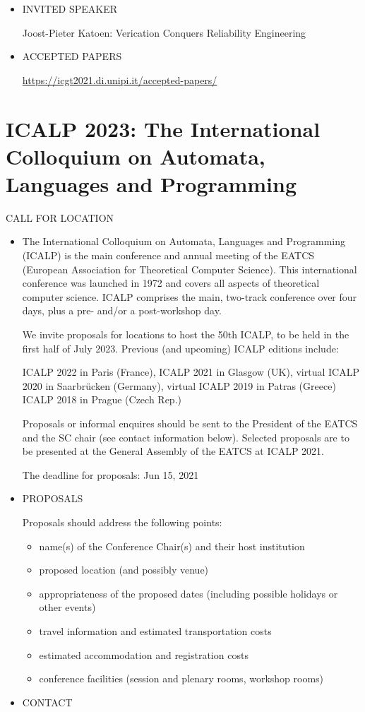 \documentclass[prodmode,acmtecs]{acmsmall} %
\begin{document}
\begin{itemize}
\item  INVITED SPEAKER 
 
  Joost-Pieter Katoen: Verication Conquers Reliability Engineering 
 
\item  ACCEPTED PAPERS 
 
  \href{https://icgt2021.di.unipi.it/accepted-papers/}{https://icgt2021.di.unipi.it/accepted-papers/} 
 
\end{itemize}\section{ICALP 2023: The International Colloquium on Automata, Languages and Programming}\label{ICALP2023}CALL FOR LOCATION 

\begin{itemize}\item  The International Colloquium on Automata, Languages and Programming (ICALP) is the main conference and annual meeting of the EATCS (European Association for Theoretical Computer Science). This international conference was launched in 1972 and covers all aspects of theoretical computer science. ICALP comprises the main, two-track conference over four days, plus a pre- and/or a post-workshop day. 
 
  We invite proposals for locations to host the 50th ICALP, to be held in the first half of July 2023. Previous (and upcoming) ICALP editions include: 
 
  ICALP 2022 in Paris (France), ICALP 2021 in Glasgow (UK), virtual ICALP 2020 in Saarbrücken (Germany), virtual ICALP 2019 in Patras (Greece) ICALP 2018 in Prague (Czech Rep.)  
 
  Proposals or informal enquires should be sent to the President of the EATCS and the SC chair (see contact information below). Selected proposals are to be presented at the General Assembly of the EATCS at ICALP 2021. 
 
The deadline for proposals: Jun 15, 2021 
 
\item  PROPOSALS 
 
  Proposals should address the following points: 
 
\begin{itemize}\item  name(s) of the Conference Chair(s) and their host institution 
\item  proposed location (and possibly venue) 
\item  appropriateness of the proposed dates (including possible holidays or other events) 
\item  travel information and estimated transportation costs 
\item  estimated accommodation and registration costs 
\item  conference facilities (session and plenary rooms, workshop rooms)
\end{itemize} 
\item  CONTACT  
 

\end{itemize}
\end{document}
